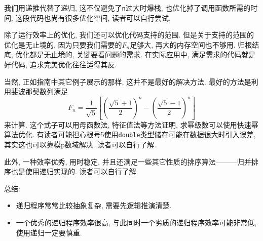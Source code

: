         我们用递推代替了递归, 这不仅避免了\texttt{n}过大时爆栈, 也优化掉了调用函数所需的时间. 这段代码也尚有很多优化空间, 读者可以自行尝试.

        除了运行效率上的优化, 我们还可以优化代码支持的范围. 但是关于支持的范围的优化是无止境的, 因为只要我们需要的$F_n$足够大, 再大的内存空间也不够用. 归根结底, 优化都是无止境的, 关键要看问题的需求. 在实际应用中, 满足需求的代码就是好代码, 追求完美优化往往适得其反.
        
        当然, 正如指南中其它例子展示的那样, 这并不是最好的解决方法. 最好的方法是利用斐波那契数列满足
            \[ F_n = \dfrac{1}{\sqrt{5}} \left[ \left( \dfrac{\sqrt{5} + 1}{2} \right)^n - \left( \dfrac{\sqrt{5} - 1}{2} \right)^n \right] \]
        来计算. 这个式子可以用母函数法, 特征值法等方法证明, 求幂级数可以使用快速幂算法优化. 有读者可能担心根号5使用\texttt{double}类型储存可能在数据很大时引入误差, 其实这也可以靠模p数域解决. 读者可以自行了解.

        此外, 一种效率优秀, 用时稳定, 并且还满足一些其它性质的排序算法———归并排序也是使用递归实现的. 读者可以自行了解.

        总结:
        \begin{itemize}
            \item 递归程序常常比较抽象复杂, 需要先逻辑推演清楚.
            \item 一个优秀的递归程序效率很高, 与此同时一个劣质的递归程序效率可能非常低, 使用递归一定要慎重.
        \end{itemize}